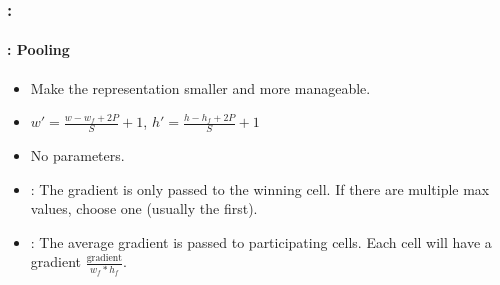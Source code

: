 \documentclass[xcolor=table]{beamer}
\begin{document}
\begin{frame}
	\frametitle{\insertshortsubtitle: \insertsection}
	\framesubtitle{\insertsubsection: Pooling}
	
	\begin{minipage}{0.60\textwidth} 
		\begin{itemize}
			\item Make the representation smaller and more manageable.
			\item $ w' = \frac{w - w_f + 2P}{S} + 1$, $ h' = \frac{h - h_f + 2P}{S} + 1$
			\item No parameters.
			\item {}: The gradient is only passed to the winning cell. If there are multiple max values, choose one (usually the first).
			\item {}: The average gradient is passed to participating cells. Each cell will have a gradient $\frac{\text{gradient}}{w_f * h_f}$.
		\end{itemize}
	\end{minipage}
	\begin{minipage}{0.39\textwidth}
		
	\end{minipage}

\end{frame}
\end{document}
